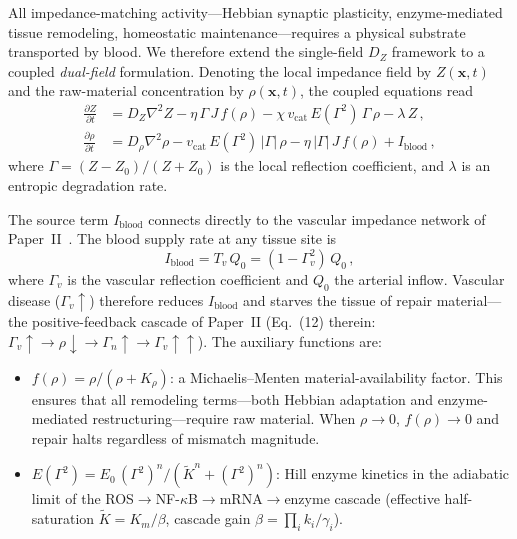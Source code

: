 ﻿\documentclass[aps,pre,twocolumn,superscriptaddress,floatfix]{revtex4-2}
\begin{document}
All impedance-matching activity---Hebbian synaptic
plasticity, enzyme-mediated tissue remodeling, homeostatic
maintenance---requires a physical substrate transported by blood.
We therefore extend the single-field $D_Z$ framework to a
coupled \emph{dual-field} formulation.
Denoting the local impedance field by $Z(\mathbf{x},t)$ and
the raw-material concentration by $\rho(\mathbf{x},t)$, the
coupled equations read
\begin{align}
  \frac{\partial Z}{\partial t}
  &= D_Z\nabla^2 Z
   - \eta\,\Gamma\,J\,f(\rho)
   - \chi\,v_{\mathrm{cat}}\,E(\Gamma^2)\,\Gamma\,\rho
   - \lambda\,Z\,,
  \label{eq:Z-field}
  \\[4pt]
  \frac{\partial \rho}{\partial t}
  &= D_\rho\nabla^2\rho
   - v_{\mathrm{cat}}\,E(\Gamma^2)\,|\Gamma|\,\rho
   - \eta\,|\Gamma|\,J\,f(\rho)
   + I_{\mathrm{blood}}\,,
  \label{eq:rho-field}
\end{align}
where $\Gamma = (Z - Z_0)/(Z + Z_0)$ is the local
reflection coefficient, and $\lambda$ is an entropic
degradation rate.

The source term $I_{\mathrm{blood}}$ connects directly to
the vascular impedance network of Paper~II~\cite{PaperII}.
The blood supply rate at any tissue site is
\begin{equation}
  I_{\mathrm{blood}} = T_v\,Q_0 = (1 - \Gamma_v^2)\,Q_0\,,
  \label{eq:Iblood-Gv}
\end{equation}
where $\Gamma_v$ is the vascular reflection coefficient and
$Q_0$ the arterial inflow.
Vascular disease ($\Gamma_v \uparrow$) therefore reduces
$I_{\mathrm{blood}}$ and starves the tissue of repair
material---the positive-feedback cascade of Paper~II
(Eq.~(12) therein: $\Gamma_v\!\uparrow \to \rho\!\downarrow
\to \Gamma_n\!\uparrow \to \Gamma_v\!\uparrow\!\uparrow$).
The auxiliary functions are:
\begin{itemize}
  \item $f(\rho) = \rho/(\rho + K_\rho)$: a Michaelis--Menten
    material-availability factor.
    This ensures that all remodeling terms---both Hebbian
    adaptation and enzyme-mediated restructuring---require
    raw material.
    When $\rho \to 0$, $f(\rho) \to 0$ and repair halts
    regardless of mismatch magnitude.
  \item $E(\Gamma^2) = E_0\,
    (\Gamma^2)^n / (\tilde{K}^n + (\Gamma^2)^n)$:
    Hill enzyme kinetics in the adiabatic limit of the
    ROS${\to}$NF-$\kappa$B${\to}$mRNA${\to}$enzyme cascade
    (effective half-saturation $\tilde{K} = K_m/\beta$,
    cascade gain $\beta = \prod_i k_i/\gamma_i$).
\end{itemize}
\end{document}
